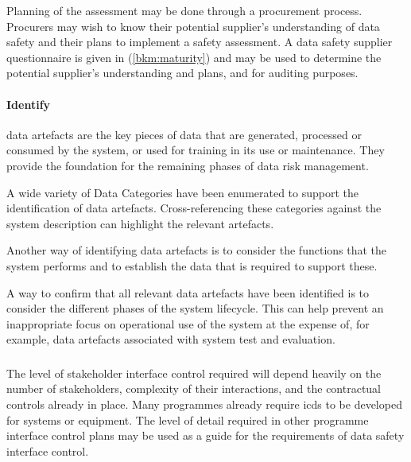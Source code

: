 Planning of the assessment may be done through a procurement process. Procurers may wish to know their potential supplier's understanding of data safety and their plans to implement a \gls{safety assessment}. A data safety supplier questionnaire is given in (\autoref{bkm:maturity}) and may be used to determine the potential supplier's understanding and plans, and for auditing purposes.

\paragraph{Identify }
\Glspl{data artefact} are the key pieces of data that are generated, processed or consumed by the system, or used for training in its use or maintenance. They provide the foundation for the remaining phases of data risk management.

A wide variety of Data Categories have been enumerated to support the identification of \glspl{data artefact}. Cross-referencing these categories against the system description can highlight the relevant artefacts. 

Another way of identifying \glspl{data artefact} is to consider the functions that the system performs and to establish the data that is required to support these.

A way to confirm that all relevant \glspl{data artefact} have been identified is to consider the different phases of the system lifecycle. This can help prevent an inappropriate focus on operational use of the system at the expense of, for example, \glspl{data artefact} associated with system test and evaluation.

\subsubsection{}
The level of
\gls{stakeholder}
interface control required will depend heavily on the number of \glspl{stakeholder}, complexity of their interactions, and the contractual controls already in place. Many programmes already require \glspl{icd} to be developed for systems or equipment. The level of detail required in other programme interface control plans may be used as a guide for the requirements of data safety interface control. 

